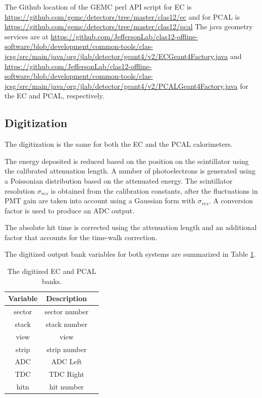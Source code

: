 The Github location of the GEMC perl API script for EC  is \url{https://github.com/gemc/detectors/tree/master/clas12/ec} and
for PCAL is \url{https://github.com/gemc/detectors/tree/master/clas12/pcal}
The java geometry services are at 
\url{https://github.com/JeffersonLab/clas12-offline-software/blob/development/common-tools/clas-jcsg/src/main/java/org/jlab/detector/geant4/v2/ECGeant4Factory.java} and
\url{https://github.com/JeffersonLab/clas12-offline-software/blob/development/common-tools/clas-jcsg/src/main/java/org/jlab/detector/geant4/v2/PCALGeant4Factory.java}
for the EC and PCAL, respectively.


\subsection{Digitization}
The digitization is the same for both the EC and the PCAL calorimeters.

The energy deposited is reduced based on the position on the scintillator using the calibrated attenuation length.
A number of photoelectrons is generated using a Poissonian distribution based on the attenuated energy.
The scintillator resolution $\sigma_{res}$ is obtained from the calibration constants, after the fluctuations in PMT gain
are taken into account using a Gaussian form with $\sigma_{res}$. A conversion factor is used to produce an ADC output.

The absolute hit time is corrected using the attenuation length and an additional factor that accounts for the time-walk correction.

The digitized output bank variables for both systems are summarized in Table \ref{tab:ecBank}.

\begin{table}[h]
	\begin{center}
		\begin{tabular}{| c | c | c |}
			\hline \hline
			Variable & Description                                         \\
			\hline
             sector  &                                     sector number   \\
              stack  &                                      stack number   \\
               view  &                                              view   \\
              strip  &                                      strip number   \\
                ADC  &                                          ADC Left   \\
                TDC  &                                         TDC Right   \\
               hitn  &                                        hit number   \\
			\hline \hline
		\end{tabular}
	\end{center}
	\caption{The digitized EC and PCAL banks.}\label{tab:ecBank}
\end{table}


